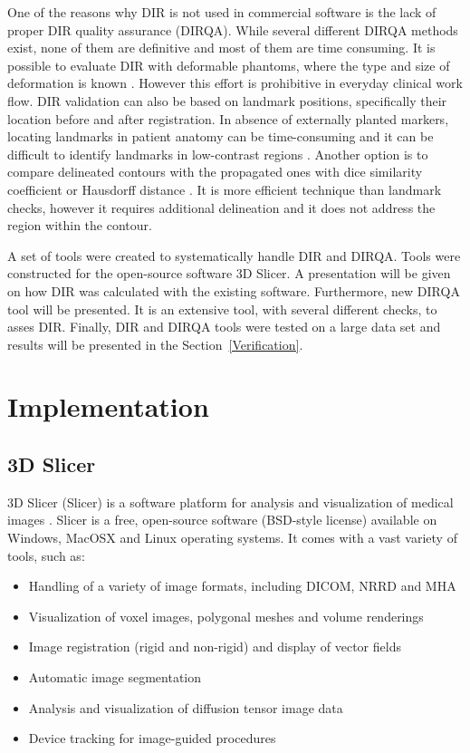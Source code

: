 \documentclass[type=dr, dr=rernat, accentcolor=tud7b,colorbacktitle, bigchapter, openright, twoside, 12pt ]{tudthesis}
\begin{document}
One of the reasons why DIR is not used in commercial software is the lack of proper DIR quality assurance (DIRQA). While several different DIRQA methods exist, none of them are definitive and most of them are time consuming. 
It is possible to evaluate DIR with deformable phantoms, where the type and size of deformation is known \cite{Kashani2007, Kirby2011}. However this effort is prohibitive 
in everyday clinical work flow. DIR validation can also be based on landmark positions, specifically their location before and after registration. In absence of externally planted markers, locating landmarks in patient 
anatomy can be time-consuming and it can be difficult to identify landmarks in low-contrast regions \cite{Varadhan2013}. Another option is to compare delineated contours with the propagated ones with dice similarity coefficient \cite{Varadhan2013} or Hausdorff distance \cite{Huttenlocher1993}. 
It is more efficient technique than landmark checks, however it requires additional delineation and it does not address the region within the contour.

A set of tools were created to systematically handle DIR and DIRQA. Tools were constructed for the open-source software 3D Slicer. 
A presentation will be given on how DIR was calculated with the existing software. Furthermore, new DIRQA tool will be presented. It is an extensive tool,
with several different checks, to asses DIR. Finally, DIR and DIRQA tools were tested on a large data set and results will be presented in the Section~\ref{Verification}.

\section{Implementation}
\label{Implementation}

\subsection{3D Slicer}
\label{Slicer}

3D Slicer (Slicer) is a software platform for analysis and visualization of medical images \cite{Slicer, Fedorov2012}. Slicer is a free, open-source software (BSD-style license) available on Windows, MacOSX and Linux operating systems. 
It comes with a vast variety of tools, such as:

\begin{itemize}
	\item Handling of a variety of image formats, including DICOM, NRRD and MHA
	\item Visualization of voxel images, polygonal meshes and volume renderings
	\item Image registration (rigid and non-rigid) and display of vector fields
	\item Automatic image segmentation
	\item Analysis and visualization of diffusion tensor image data
	\item Device tracking for image-guided procedures
\end{itemize}
\end{document}
